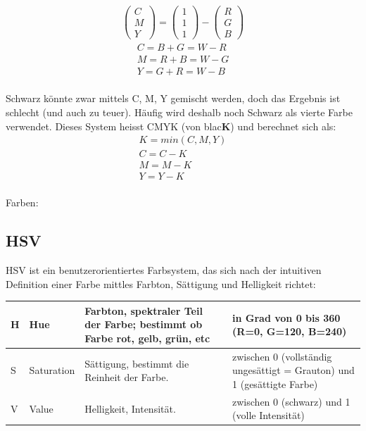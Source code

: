 \begin{gather*}
\begin{pmatrix} C \\ M \\ Y \end{pmatrix} = 
\begin{pmatrix} 1 \\ 1 \\ 1 \end{pmatrix} -
\begin{pmatrix} R \\ G \\ B \end{pmatrix}
\end{gather*}
\begin{gather*}
C = B + G = W - R \\
M = R + B = W - G \\
Y = G + R = W - B \\
\end{gather*}

\noindent
Schwarz könnte zwar mittels C, M, Y gemischt werden, doch das Ergebnis ist schlecht (und auch zu teuer). Häufig wird deshalb noch Schwarz als vierte Farbe verwendet. Dieses System heisst CMYK (von blac\textbf{K}) und berechnet sich als:
\begin{gather*}
K = min(C, M, Y )\\
C = C - K \\
M = M - K \\
Y = Y - K \\
\end{gather*}

Farben:


\subsection{HSV} 
HSV ist ein benutzerorientiertes Farbsystem, das sich nach der intuitiven Definition einer Farbe mittles Farbton, Sättigung und Helligkeit richtet:
\begin{center}
\begin{tabular}{ | l | l | p{5cm} | p{5cm} |}
\hline
H & Hue        & Farbton, spektraler Teil der Farbe; bestimmt ob Farbe rot, gelb, grün, etc & in Grad von 0 bis 360  (R=0, G=120, B=240)                              \\ \hline
S & Saturation & Sättigung, bestimmt die Reinheit der Farbe.                                & zwischen 0 (vollständig ungesättigt = Grauton) und 1 (gesättigte Farbe) \\ \hline
V & Value      & Helligkeit, Intensität.                                                    & zwischen 0 (schwarz) und 1 (volle Intensität)   \\     
\hline
\end{tabular}
\end{center}

